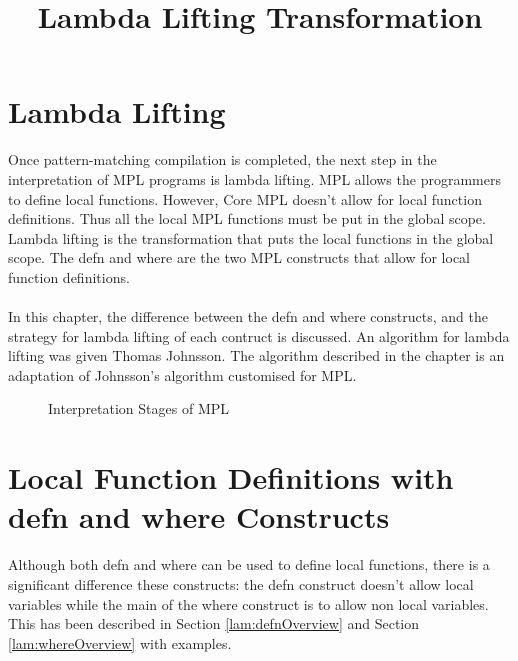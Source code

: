 \documentclass[11pt]{article}
\title{Lambda Lifting Transformation}
\begin{document}
\maketitle
\section {Lambda Lifting} 
Once pattern-matching compilation is completed, the next step in the interpretation of MPL programs is lambda lifting. MPL allows the programmers to define local functions. However, Core MPL doesn't allow for local function definitions. Thus all the local MPL functions must be put in the global scope. Lambda lifting is the transformation that puts the local functions in the global scope. The {\sf defn} and {\sf where} are the two MPL constructs that allow for local function definitions. 
~~\\~~\\ 
In this chapter, the difference between the {\sf defn} and {\sf where} constructs, and the strategy for lambda lifting of each contruct is discussed. An algorithm for lambda lifting was given Thomas Johnsson. The algorithm described in the chapter is an adaptation of Johnsson's algorithm customised for MPL.
\begin{figure}[!h]
\begin {center}
\caption{Interpretation Stages of MPL} \label{fig:CSAM}
\end{center}
\end{figure}



\section {Local Function Definitions with defn and where Constructs}
Although both {\sf defn} and {\sf where} can be used to define local functions, there is a significant difference these constructs: the {\sf defn} construct doesn't allow local variables while the main of the {\sf where} construct is to allow non local variables. This has been described in Section \ref {lam:defnOverview} and Section \ref {lam:whereOverview} with examples.
\end{document}

